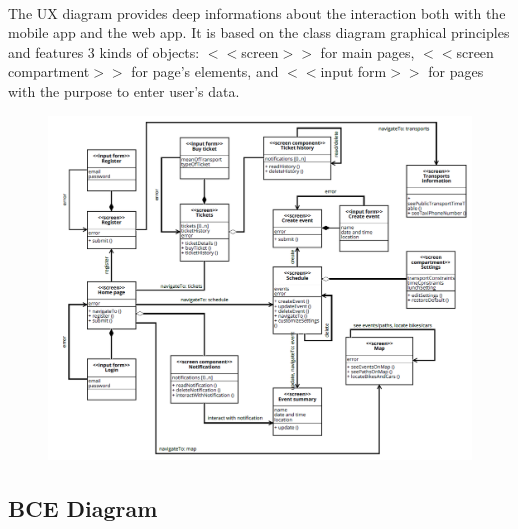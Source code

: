 \documentclass{article}
\begin{document}
			\paragraph{}The UX diagram provides deep informations about the interaction both with the mobile app and the web app. It is based on the class diagram graphical principles and features 3 kinds of objects: $<$$<$screen$>$$>$ for main pages, $<$$<$screen compartment$>$$>$ for page’s elements, and $<$$<$input form$>$$>$ for pages with the purpose to enter user’s data.
			\begin{figure}[H]
			\includegraphics[width=\linewidth]{Images/Mockup/UX_BCE/UX.png}
			\caption{}
			\label{UX}
			\end{figure}
		\newpage
		\subsection{BCE Diagram}
\end{document}
